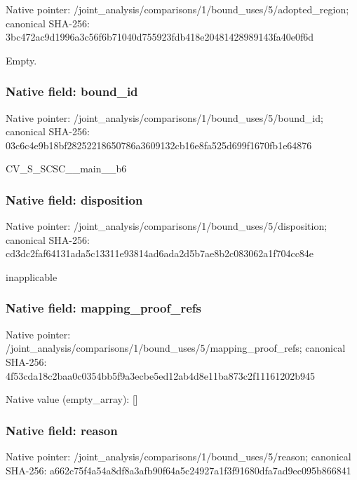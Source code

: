 \documentclass[10pt,a4paper]{article}
\begin{document}
Native pointer: /joint\_analysis/comparis\allowbreak{}ons/1/bound\_uses/5/adopt\allowbreak{}ed\_region; canonical SHA-256: 3bc472ac9d1996a3c56f6b71\allowbreak{}040d755923fdb418e2048142\allowbreak{}8989143fa40e0f6d


Empty.


\subsubsection{Native field: bound\_id}


Native pointer: /joint\_analysis/comparis\allowbreak{}ons/1/bound\_uses/5/bound\allowbreak{}\_id; canonical SHA-256: 03c6c4e9b18bf28252218650\allowbreak{}786a3609132cb16e8fa525d6\allowbreak{}99f1670fb1e64876


CV\_S\_SCSC\_\_main\_\_b6


\subsubsection{Native field: disposition}


Native pointer: /joint\_analysis/comparis\allowbreak{}ons/1/bound\_uses/5/dispo\allowbreak{}sition; canonical SHA-256: cd3dc2faf64131ada5c13311\allowbreak{}e93814ad6ada2d5b7ae8b2c0\allowbreak{}83062a1f704cc84e


inapplicable


\subsubsection{Native field: mapping\_proof\_refs}


Native pointer: /joint\_analysis/comparis\allowbreak{}ons/1/bound\_uses/5/mappi\allowbreak{}ng\_proof\_refs; canonical SHA-256: 4f53cda18c2baa0c0354bb5f\allowbreak{}9a3ecbe5ed12ab4d8e11ba87\allowbreak{}3c2f11161202b945



Native value (empty\_array): []



\subsubsection{Native field: reason}


Native pointer: /joint\_analysis/comparis\allowbreak{}ons/1/bound\_uses/5/reaso\allowbreak{}n; canonical SHA-256: a662c75f4a54a8df8a3afb90\allowbreak{}f64a5c24927a1f3f91680dfa\allowbreak{}7ad9ec095b866841
\end{document}
